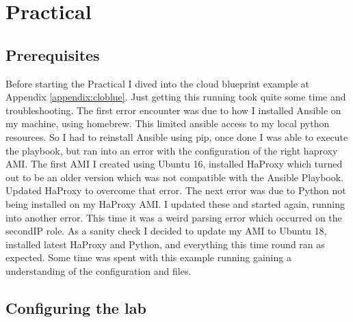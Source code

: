\section{Practical}
\subsection{Prerequisites}
Before starting the Practical I dived into the cloud blueprint example at Appendix \ref{appendix:cloblue}. Just getting this running took quite some time and troubleshooting. The first error encounter was due to how I installed Ansible on my machine, using homebrew. This limited ansible access to my local python resources. So I had to reinstall Ansible using pip, once done I was able to execute the playbook, but ran into an error with the configuration of the right haproxy AMI. The first AMI I created using Ubuntu 16, installed HaProxy which turned out to be an older version which was not compatible with the Ansible Playbook. Updated HaProxy to overcome that error. The next error was due to Python not being installed on my HaProxy AMI. I updated these and started again, running into another error. This time it was a weird parsing error which occurred on the secondIP role. As a sanity check I decided to update my AMI to Ubuntu 18, installed latest HaProxy and Python, and everything this time round ran as expected. Some time was spent with this example running gaining a understanding of the configuration and files.

\subsection{Configuring the lab}
